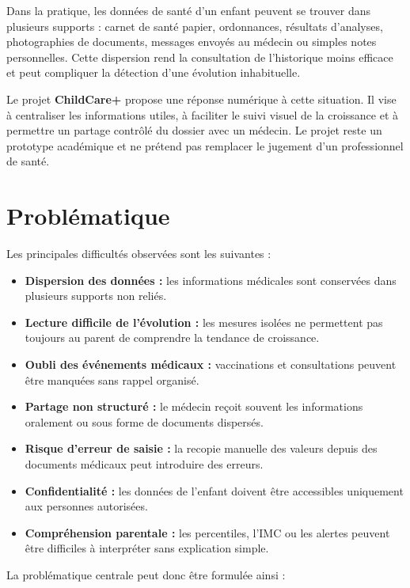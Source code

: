 Dans la pratique, les données de santé d'un enfant peuvent se trouver dans plusieurs supports : carnet de santé papier, ordonnances, résultats d'analyses, photographies de documents, messages envoyés au médecin ou simples notes personnelles. Cette dispersion rend la consultation de l'historique moins efficace et peut compliquer la détection d'une évolution inhabituelle.

Le projet \textbf{ChildCare+} propose une réponse numérique à cette situation. Il vise à centraliser les informations utiles, à faciliter le suivi visuel de la croissance et à permettre un partage contrôlé du dossier avec un médecin. Le projet reste un prototype académique et ne prétend pas remplacer le jugement d'un professionnel de santé.

\section{Problématique}
\label{sec:problematique}

Les principales difficultés observées sont les suivantes :

\begin{itemize}
    \item \textbf{Dispersion des données :} les informations médicales sont conservées dans plusieurs supports non reliés.
    \item \textbf{Lecture difficile de l'évolution :} les mesures isolées ne permettent pas toujours au parent de comprendre la tendance de croissance.
    \item \textbf{Oubli des événements médicaux :} vaccinations et consultations peuvent être manquées sans rappel organisé.
    \item \textbf{Partage non structuré :} le médecin reçoit souvent les informations oralement ou sous forme de documents dispersés.
    \item \textbf{Risque d'erreur de saisie :} la recopie manuelle des valeurs depuis des documents médicaux peut introduire des erreurs.
    \item \textbf{Confidentialité :} les données de l'enfant doivent être accessibles uniquement aux personnes autorisées.
    \item \textbf{Compréhension parentale :} les percentiles, l'IMC ou les alertes peuvent être difficiles à interpréter sans explication simple.
\end{itemize}

La problématique centrale peut donc être formulée ainsi :

